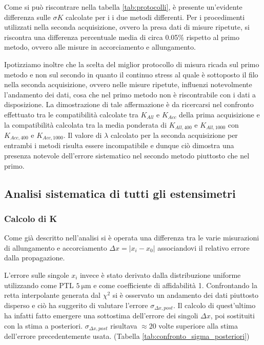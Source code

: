 \documentclass[a4paper,11pt,oneside]{article}
\begin{document}
Come si può riscontrare nella tabella \ref{tab:protocolli}, è presente un'evidente differenza sulle $\sigma K$ calcolate per i i due metodi differenti. Per i procedimenti utilizzati nella seconda acquisizione, ovvero la presa dati di misure ripetute, si riscontra una differenza percentuale media di circa 0.05\%  rispetto al primo metodo, ovvero alle misure in accorciamento e allungamento. 

Ipotizziamo inoltre che la scelta del miglior protocollo di misura ricada sul primo metodo e non sul secondo in quanto il continuo stress al quale è sottoposto il filo nella seconda acquisizione, ovvero nelle misure ripetute, influenzi notevolmente l'andamento dei dati, cosa che nel primo metodo non è riscontrabile con i dati a disposizione. La dimostrazione di tale affermazione è da ricercarsi nel confronto effettuato tra le compatibilità calcolate tra  $K_{All}$ e $K_{Acc}$ della prima acquisizione e la compatibilità calcolata tra la media ponderata di $K_{All, 400}$ e $K_{All, 1000}$ con $K_{Acc, 400}$ e $K_{Acc, 1000}$. Il valore di $\lambda$ calcolato per la seconda acquisizione per entrambi i metodi risulta essere incompatibile e dunque ciò dimostra una presenza notevole dell'errore sistematico nel secondo metodo piuttosto che nel primo.

\subsection{Analisi sistematica di tutti gli estensimetri}
\subsubsection*{Calcolo di K}
Come già descritto nell'analisi si è operata una differenza tra le varie misurazioni di allungamento e accorciamento $\Delta x= |x_i - x_0|$ associandovi il relativo errore dalla propagazione.

L'errore sulle singole $x_i$ invece è stato derivato dalla distribuzione uniforme utilizzando come PTL $\SI{5}{\micro\meter}$ e come coefficiente di affidabilità 1. Confrontando la retta interpolante generata dal $\chi^2$ si è osservato un andamento dei dati piuttosto disperso e ciò ha suggerito di valutare l'errore $\sigma_{\Delta x, post}$. Il calcolo di quest'ultimo ha infatti fatto emergere una sottostima dell'errore dei singoli $\Delta x$, poi sostituiti con la stima a posteriori. $\sigma_{\Delta x, post}$ risultava $\approx 20$ volte superiore alla stima dell'errore precedentemente usata. (Tabella \ref{tab:confronto_sigma_posteriori})
\end{document}
